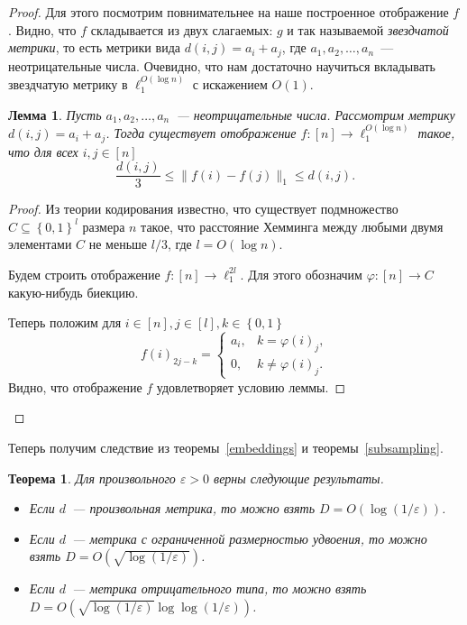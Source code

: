 \documentclass[12pt]{article}
\newcommand{\eps}{\varepsilon}
\newcommand{\set}[1]{\left\{#1\right\}}
\newcommand{\zo}{\set{0, 1}}
\newtheorem{theorem}{Теорема}
\newtheorem{lemma}{Лемма}
\begin{document}
\begin{proof}
        Для этого посмотрим повнимательнее на наше построенное отображение $f$. Видно, что $f$ складывается из
        двух слагаемых: $g$ и так называемой \emph{звездчатой метрики}, то есть метрики вида $d(i, j) = a_i + a_j$,
        где $a_1, a_2, \ldots, a_n$~--- неотрицательные числа.
        Очевидно, что нам достаточно научиться вкладывать звездчатую метрику в $\ell_1^{O(\log n)}$
        с искажением $O(1)$.

        \begin{lemma}
            Пусть $a_1, a_2, \ldots, a_n$~--- неотрицательные числа. Рассмотрим метрику $d(i, j) = a_i + a_j$.
            Тогда существует отображение $f \colon [n] \to \ell_1^{O(\log n)}$ такое, что для всех $i, j \in [n]$
            $$
                \frac{d(i, j)}{3} \leq \|f(i) - f(j)\|_1 \leq d(i, j).
            $$
        \end{lemma}
        \begin{proof}
            Из теории кодирования известно, что существует подмножество $C \subseteq \zo^{l}$ размера $n$
            такое, что расстояние Хемминга между любыми двумя элементами $C$ не меньше $l / 3$, где $l = O(\log n)$.

            Будем строить отображение $f \colon [n] \to \ell_1^{2l}$. Для этого обозначим $\varphi \colon [n] \to C$
            какую-нибудь биекцию.

            Теперь положим для $i \in [n], j \in [l], k \in \zo$
            $$
                f(i)_{2j-k} = \begin{cases}
                    a_i, & k = \varphi(i)_j, \\
                    0, & k \ne \varphi(i)_j.
                \end{cases}
            $$
            Видно, что отображение $f$ удовлетворяет условию леммы.
        \end{proof}
    \end{proof}

    Теперь получим следствие из теоремы~\ref{embeddings} и теоремы~\ref{subsampling}.
    \begin{theorem}
        Для произвольного $\eps > 0$ верны следующие результаты.
        \begin{itemize}
            \item
            Если $d$~--- произвольная метрика, то можно взять $D = O(\log (1 / \eps))$. 
            \item
            Если $d$~--- метрика с ограниченной размерностью удвоения, то можно взять $D = O(\sqrt{\log (1 / \eps)})$.
            \item
            Если $d$~--- метрика отрицательного типа, то можно взять $D = O(\sqrt{\log (1 / \eps)} \log \log (1 / \eps))$.
        \end{itemize}
    \end{theorem}
\end{document}
